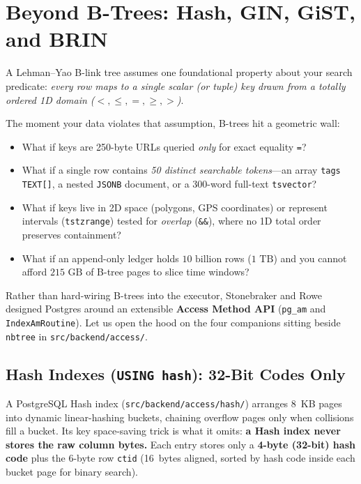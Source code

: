 \section{Beyond B-Trees: Hash, GIN, GiST, and BRIN}
\label{sec:ch03-beyond-btrees}

A Lehman--Yao B-link tree assumes one foundational property about your search predicate: \emph{every row maps to a single scalar (or tuple) key drawn from a totally ordered 1D domain ($<, \le, =, \ge, >$)}.

The moment your data violates that assumption, B-trees hit a geometric wall:
\begin{itemize}
  \item What if keys are 250-byte URLs queried \emph{only} for exact equality \texttt{=}?
  \item What if a single row contains \emph{50 distinct searchable tokens}---an array \texttt{tags TEXT[]}, a nested \texttt{JSONB} document, or a 300-word full-text \texttt{tsvector}?
  \item What if keys live in 2D space (polygons, GPS coordinates) or represent intervals (\texttt{tstzrange}) tested for \emph{overlap} (\texttt{\&\&}), where no 1D total order preserves containment?
  \item What if an append-only ledger holds $10\text{ billion}$ rows ($1\text{ TB}$) and you cannot afford $215\text{ GB}$ of B-tree pages to slice time windows?
\end{itemize}
Rather than hard-wiring B-trees into the executor, Stonebraker and Rowe designed Postgres around an extensible \textbf{Access Method API} (\texttt{pg\_am} and \texttt{IndexAmRoutine}). Let us open the hood on the four companions sitting beside \texttt{nbtree} in \texttt{src/backend/access/}.

\subsection{Hash Indexes (\texttt{USING hash}): 32-Bit Codes Only}

A PostgreSQL Hash index (\texttt{src/backend/access/hash/}) arranges 8~KB pages into dynamic linear-hashing buckets, chaining overflow pages only when collisions fill a bucket. Its key space-saving trick is what it omits: \textbf{a Hash index never stores the raw column bytes.} Each entry stores only a \textbf{4-byte (32-bit) hash code} plus the 6-byte row \texttt{ctid} (16~bytes aligned, sorted by hash code inside each bucket page for binary search).


